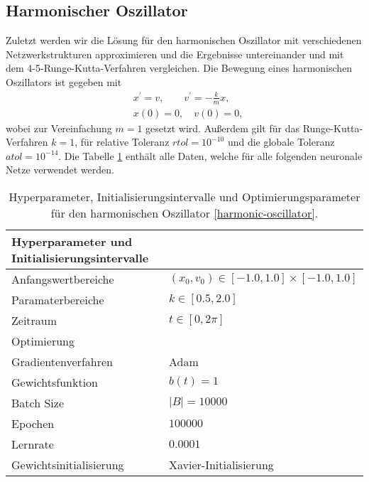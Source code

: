 \subsection{Harmonischer Oszillator}
\label{sec:harmonischer-oszillator}
Zuletzt werden wir die Lösung für den harmonischen Oszillator mit verschiedenen Netzwerkstrukturen approximieren und
die Ergebnisse untereinander und mit dem 4-5-Runge-Kutta-Verfahren vergleichen. Die Bewegung eines harmonischen
Oszillators ist gegeben mit
\begin{align}
       \label{harmonic-oscillator}
       &x^{\prime}=v, \qquad v^{\prime}=-\frac{k}{m}x, \\
       &x(0)=0, \quad v(0)=0, \nonumber
\end{align}
wobei zur Vereinfachung $m=1$ gesetzt wird. Außerdem gilt für das Runge-Kutta-Verfahren $k=1$, für relative Toleranz
$rtol = 10^{-10}$ und die globale Toleranz $atol = 10^{-14}$. Die Tabelle \ref{stiff-table-data} enthält alle Daten,
welche für alle folgenden neuronale Netze verwendet werden.
\begin{table}
       \renewcommand{\arraystretch}{1.0}
       \centering
       \begin{tabular}{ l | l }
              \hline
              Hyperparameter und Initialisierungsintervalle & \\
              \hline
              Anfangswertbereiche &
              $(x_{0},v_0) \in [-1.0, 1.0] \times [-1.0, 1.0]$ \\
              Paramaterbereiche & $k \in [0.5, 2.0]$ \\
              Zeitraum & $t \in [0, 2\pi]$ \\
              \hline
              Optimierung & \\
              \hline
              Gradientenverfahren & Adam \\
              Gewichtsfunktion & $b(t)=1$ \\
              Batch Size & $|B|=10000$ \\
              Epochen & $100000$ \\
              Lernrate & $0.0001$ \\
              Gewichtsinitialisierung & Xavier-Initialisierung \\
              \hline
       \end{tabular}
       \caption{Hyperparameter, Initialisierungsintervalle und Optimierungsparameter für den harmonischen Oszillator
       \eqref{harmonic-oscillator}.}
       \label{stiff-table-data}
\end{table}
